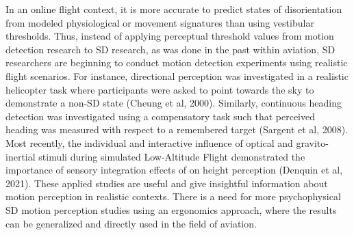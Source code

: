 \documentclass[11pt, onecolumn]{article}
\begin{document}
In an online flight context, it is more accurate to predict states of disorientation from modeled physiological or movement signatures than using vestibular thresholds.  Thus, instead of applying perceptual threshold values from motion detection research to SD research, as was done in the past within aviation, SD researchers are beginning to conduct motion detection experiments using realistic flight scenarios.  For instance, directional perception was investigated in a realistic helicopter task where participants were asked to point towards the sky to demonstrate a non-SD state (Cheung et al, 2000).  Similarly, continuous heading detection was investigated using a compensatory task such that perceived heading was measured with respect to a remembered target (Sargent et al, 2008).  Most recently, the individual and interactive influence of optical and gravito-inertial stimuli during simulated Low-Altitude Flight demonstrated the importance of sensory integration effects of on height perception (Denquin et al, 2021).  These applied studies are useful and give insightful information about motion perception in realistic contexts.  There is a need for more psychophysical SD motion perception studies using an ergonomics approach, where the results can be generalized and directly used in the field of aviation.
\end{document}
